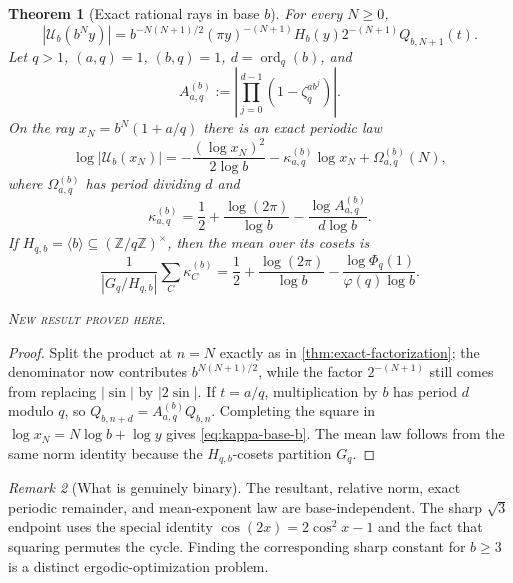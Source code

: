 \documentclass[11pt,oneside]{article}
\newtheorem{theorem}{Theorem}[section]
\theoremstyle{definition}
\theoremstyle{remark}
\newtheorem{remark}[theorem]{Remark}
\newcommand{\Z}{\mathbb Z}
\newcommand{\ord}{\operatorname{ord}}
\newcommand{\newresult}{\textcolor{newgreen}{\textsc{New result proved here.}}}
\begin{document}
\begin{theorem}[Exact rational rays in base $b$]\label{thm:base-b}
For every $N\ge0$,
\begin{equation}
 |\mathscr U_b(b^Ny)|
 =b^{-N(N+1)/2}(\pi y)^{-(N+1)}H_b(y)2^{-(N+1)}Q_{b,N+1}(t).
 \label{eq:base-b-factorization}
\end{equation}
Let $q>1$, $(a,q)=1$, $(b,q)=1$, $d=\ord_q(b)$, and
\begin{equation}
 A_{a,q}^{(b)}:=\left|\prod_{j=0}^{d-1}
 (1-\zeta_q^{ab^j})\right|.
 \label{eq:A-base-b}
\end{equation}
On the ray $x_N=b^N(1+a/q)$ there is an exact periodic law
\begin{equation}
 \log|\mathscr U_b(x_N)|
 =-\frac{(\log x_N)^2}{2\log b}
 -\kappa_{a,q}^{(b)}\log x_N+\Omega_{a,q}^{(b)}(N),
 \label{eq:base-b-ray}
\end{equation}
where $\Omega_{a,q}^{(b)}$ has period dividing $d$ and
\begin{equation}
 \boxed{
 \kappa_{a,q}^{(b)}=\frac12+\frac{\log(2\pi)}{\log b}
 -\frac{\log A_{a,q}^{(b)}}{d\log b}.}
 \label{eq:kappa-base-b}
\end{equation}
If $H_{q,b}=\langle b\rangle\subseteq(\Z/q\Z)^\times$, then the mean over its
cosets is
\begin{equation}
 \boxed{
 \frac1{|G_q/H_{q,b}|}\sum_C\kappa_C^{(b)}
 =\frac12+\frac{\log(2\pi)}{\log b}
 -\frac{\log\Phi_q(1)}{\varphi(q)\log b}.}
 \label{eq:mean-base-b}
\end{equation}

\smallskip\noindent\newresult
\end{theorem}

\begin{proof}
Split the product at $n=N$ exactly as in \cref{thm:exact-factorization}; the
denominator now contributes $b^{N(N+1)/2}$, while the factor $2^{-(N+1)}$ still
comes from replacing $|\sin|$ by $|2\sin|$. If $t=a/q$, multiplication by $b$ has
period $d$ modulo $q$, so $Q_{b,n+d}=A_{a,q}^{(b)}Q_{b,n}$. Completing the square
in $\log x_N=N\log b+\log y$ gives \eqref{eq:kappa-base-b}. The mean law follows
from the same norm identity because the $H_{q,b}$-cosets partition $G_q$.
\end{proof}

\begin{remark}[What is genuinely binary]
The resultant, relative norm, exact periodic remainder, and mean-exponent law are
base-independent. The sharp $\sqrt3$ endpoint uses the special identity
$\cos(2x)=2\cos^2x-1$ and the fact that squaring permutes the cycle. Finding the
corresponding sharp constant for $b\ge3$ is a distinct ergodic-optimization problem.
\end{remark}
\end{document}
